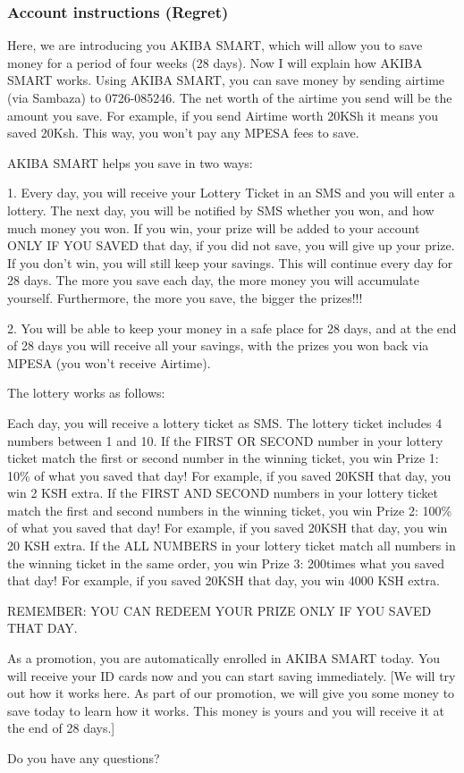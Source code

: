 \documentclass[11pt]{article}
\begin{document}
        \subsubsection{Account instructions (Regret)}

            {\setlength{\parskip}{1em} \setlength{\parindent}{0em}

            Here, we are introducing you AKIBA SMART, which will allow you to save money for a period of four weeks (28 days). Now I will explain how AKIBA SMART works.
            Using AKIBA SMART, you can save money by sending airtime (via Sambaza) to 0726-085246. The net worth of the airtime you send will be the amount you save. For example, if you send Airtime worth 20KSh it means you saved 20Ksh. This way, you won't pay any MPESA fees to save.

            AKIBA SMART helps you save in two ways:

            1. Every day, you will receive your Lottery Ticket in an SMS and you will enter a lottery. The next day, you will be notified by SMS whether you won, and how much money you won. If you win, your prize will be added to your account ONLY IF YOU SAVED that day, if you did not save, you will give up your prize. If you don't win, you will still keep your savings. This will continue every day for 28 days. The more you save each day, the more money you will accumulate yourself. Furthermore, the more you save, the bigger the prizes!!!

            2. You will be able to keep your money in a safe place for 28 days, and at the end of 28 days you will receive all your savings, with the prizes you won back via MPESA (you won't receive Airtime).

            The lottery works as follows:

            Each day, you will receive a lottery ticket as SMS. The lottery ticket includes 4 numbers between 1 and 10. If the FIRST OR SECOND number in your lottery ticket match the first or second number in the winning ticket, you win Prize 1: 10\% of what you saved that day! For example, if you saved 20KSH that day, you win 2 KSH extra. If the FIRST AND SECOND numbers in your lottery ticket match the first and second numbers in the winning ticket, you win Prize 2: 100\% of what you saved that day! For example, if you saved 20KSH that day, you win 20 KSH extra. If the ALL NUMBERS in your lottery ticket match all numbers in the winning ticket in the same order, you win Prize 3: 200times what you saved that day! For example, if you saved 20KSH that day, you win 4000 KSH extra.

            REMEMBER: YOU CAN REDEEM YOUR PRIZE ONLY IF YOU SAVED THAT DAY.

            As a promotion, you are automatically enrolled in AKIBA SMART today. You will receive your ID cards now and you can start saving immediately. [We will try out how it works here. As part of our promotion, we will give you some money to save today to learn how it works. This money is yours and you will receive it at the end of 28 days.]

            Do you have any questions?

            }
\end{document}
